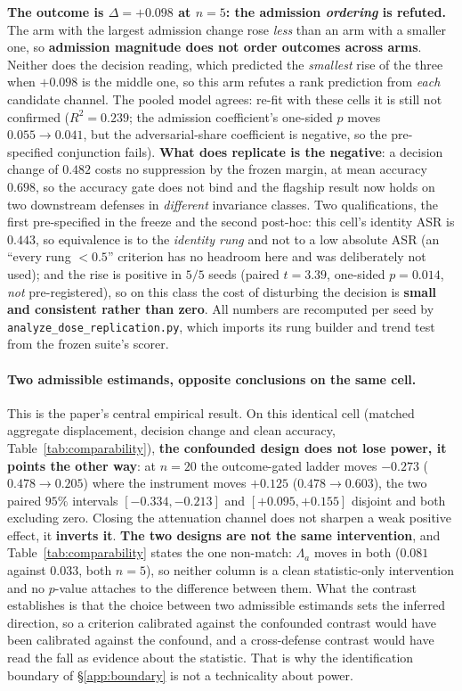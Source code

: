 \documentclass{article}
\begin{document}
\textbf{The outcome is $\Delta = +0.098$ at $n{=}5$: the admission \emph{ordering} is refuted.} The arm with the largest admission change rose \emph{less} than an arm with a smaller one, so \textbf{admission magnitude does not order outcomes across arms}. Neither does the decision reading, which predicted the \emph{smallest} rise of the three when $+0.098$ is the middle one, so this arm refutes a rank prediction from \emph{each} candidate channel. The pooled model agrees: re-fit with these cells it is still not confirmed ($R^2{=}0.239$; the admission coefficient's one-sided $p$ moves $0.055 \to 0.041$, but the adversarial-share coefficient is negative, so the pre-specified conjunction fails). \textbf{What does replicate is the negative}: a decision change of $0.482$ costs no suppression by the frozen margin, at mean accuracy $0.698$, so the accuracy gate does not bind and the flagship result now holds on two downstream defenses in \emph{different} invariance classes. Two qualifications, the first pre-specified in the freeze and the second post-hoc: this cell's identity ASR is $0.443$, so equivalence is to the \emph{identity rung} and not to a low absolute ASR (an ``every rung ${<}0.5$'' criterion has no headroom here and was deliberately not used); and the rise is positive in $5/5$ seeds (paired $t{=}3.39$, one-sided $p{=}0.014$, \emph{not} pre-registered), so on this class the cost of disturbing the decision is \textbf{small and consistent rather than zero}. All numbers are recomputed per seed by \texttt{analyze\_dose\_replication.py}, which imports its rung builder and trend test from the frozen suite's scorer.

\paragraph{Two admissible estimands, opposite conclusions on the same cell.} This is the paper's central empirical result. On this identical cell (matched aggregate displacement, decision change and clean accuracy, Table~\ref{tab:comparability}), \textbf{the confounded design does not lose power, it points the other way}: at $n{=}20$ the outcome-gated ladder moves $-0.273$ ($0.478 \to 0.205$) where the instrument moves $+0.125$ ($0.478 \to 0.603$), the two paired $95\%$ intervals $[-0.334,-0.213]$ and $[+0.095,+0.155]$ disjoint and both excluding zero. Closing the attenuation channel does not sharpen a weak positive effect, it \textbf{inverts it}. \textbf{The two designs are not the same intervention}, and Table~\ref{tab:comparability} states the one non-match: $\Lambda_a$ moves in both ($0.081$ against $0.033$, both $n{=}5$), so neither column is a clean statistic-only intervention and no $p$-value attaches to the difference between them. What the contrast establishes is that the choice between two admissible estimands sets the inferred direction, so a criterion calibrated against the confounded contrast would have been calibrated against the confound, and a cross-defense contrast would have read the fall as evidence about the statistic. That is why the identification boundary of §\ref{app:boundary} is not a technicality about power.
\end{document}
